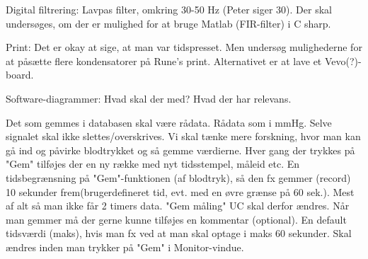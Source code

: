 Digital filtrering: Lavpas filter, omkring 30-50 Hz (Peter siger 30). Der skal undersøges, om der er mulighed for at bruge Matlab (FIR-filter) i C sharp. 

Print: Det er okay at sige, at man var tidspresset. Men undersøg mulighederne for at påsætte flere kondensatorer på Rune's print. Alternativet er at lave et Vevo(?)-board. 

Software-diagrammer: Hvad skal der med? Hvad der har relevans. 

Det som gemmes i databasen skal være rådata. Rådata som i mmHg. 
Selve signalet skal ikke slettes/overskrives. Vi skal tænke mere forskning, hvor man kan gå ind og påvirke blodtrykket og så gemme værdierne. Hver gang der trykkes på "Gem" tilføjes der en ny række med nyt tidsstempel, måleid etc. 
En tidsbegrænsning på "Gem"-funktionen (af blodtryk), så den fx gemmer (record) 10 sekunder frem(brugerdefineret tid, evt. med en øvre grænse på 60 sek.). Mest af alt så man ikke får 2 timers data. "Gem måling" UC skal derfor ændres. Når man gemmer må der gerne kunne tilføjes en kommentar (optional). 
	En default tidsværdi (maks), hvis man fx ved at man skal optage i maks 60 sekunder. Skal ændres inden man trykker på "Gem" i Monitor-vindue. 

